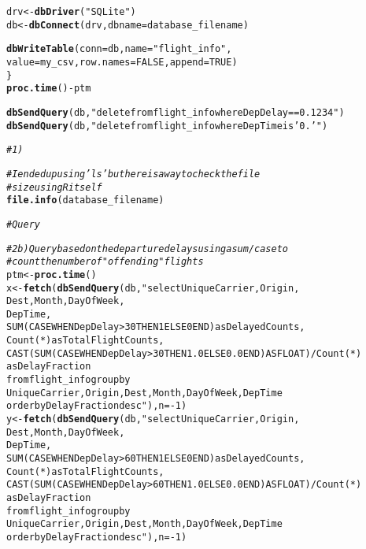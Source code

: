 \documentclass{article}\usepackage[]{graphicx}\usepackage[]{color}
\makeatletter
\newcommand{\hlnum}[1]{\textcolor[rgb]{0.686,0.059,0.569}{#1}}%
\newcommand{\hlstr}[1]{\textcolor[rgb]{0.192,0.494,0.8}{#1}}%
\newcommand{\hlcom}[1]{\textcolor[rgb]{0.678,0.584,0.686}{\textit{#1}}}%
\newcommand{\hlopt}[1]{\textcolor[rgb]{0,0,0}{#1}}%
\newcommand{\hlstd}[1]{\textcolor[rgb]{0.345,0.345,0.345}{#1}}%
\newcommand{\hlkwb}[1]{\textcolor[rgb]{0.69,0.353,0.396}{#1}}%
\newcommand{\hlkwc}[1]{\textcolor[rgb]{0.333,0.667,0.333}{#1}}%
\newcommand{\hlkwd}[1]{\textcolor[rgb]{0.737,0.353,0.396}{\textbf{#1}}}%
\newenvironment{kframe}{%
 \def\at@end@of@kframe{}%
 \ifinner\ifhmode%
  \def\at@end@of@kframe{\end{minipage}}%
  \begin{minipage}{\columnwidth}%
 \fi\fi%
 \def\FrameCommand##1{\hskip\@totalleftmargin \hskip-\fboxsep
 \colorbox{shadecolor}{##1}\hskip-\fboxsep
     \hskip-\linewidth \hskip-\@totalleftmargin \hskip\columnwidth}%
 \MakeFramed {\advance\hsize-\width
   \@totalleftmargin\z@ \linewidth\hsize
   \@setminipage}}%
 {\par\unskip\endMakeFramed%
 \at@end@of@kframe}
\newenvironment{knitrout}{}{} %
\makeatother
\begin{document}
\begin{knitrout}
\begin{kframe}
\begin{alltt}
  \hlstd{drv} \hlkwb{<-} \hlkwd{dbDriver}\hlstd{(}\hlstr{"SQLite"}\hlstd{)}
  \hlstd{db} \hlkwb{<-} \hlkwd{dbConnect}\hlstd{(drv,} \hlkwc{dbname} \hlstd{= database_filename)}

  \hlkwd{dbWriteTable}\hlstd{(}\hlkwc{conn} \hlstd{= db,} \hlkwc{name} \hlstd{=} \hlstr{"flight_info"}\hlstd{,}
             \hlkwc{value} \hlstd{= my_csv,} \hlkwc{row.names} \hlstd{=} \hlnum{FALSE}\hlstd{,} \hlkwc{append} \hlstd{=} \hlnum{TRUE}\hlstd{)}
\hlstd{\}}
\hlkwd{proc.time}\hlstd{()} \hlopt{-} \hlstd{ptm}

\hlkwd{dbSendQuery}\hlstd{(db,} \hlstr{"delete from flight_info where DepDelay==0.1234"}\hlstd{)}
\hlkwd{dbSendQuery}\hlstd{(db,} \hlstr{"delete from flight_info where DepTime is '0.'"}\hlstd{)}

\hlcom{# 1)}

\hlcom{# I ended up using 'ls' but here is a way to check the file}
\hlcom{# size using R itself}
\hlkwd{file.info}\hlstd{(database_filename)}

\hlcom{# Query }

\hlcom{# 2b) Query based on the departure delays using a sum/case to}
\hlcom{# count the number of "offending" flights}
\hlstd{ptm} \hlkwb{<-} \hlkwd{proc.time}\hlstd{()}
\hlstd{x} \hlkwb{<-} \hlkwd{fetch}\hlstd{(}\hlkwd{dbSendQuery}\hlstd{(db,} \hlstr{"select UniqueCarrier, Origin, 
                       Dest, Month, DayOfWeek, 
                       DepTime,
                       SUM(CASE WHEN DepDelay > 30 THEN 1 ELSE 0 END) as DelayedCounts, 
                       Count(*) as TotalFlightCounts,
                       CAST(SUM(CASE WHEN DepDelay > 30 THEN 1.0 ELSE 0.0 END) AS FLOAT) / Count(*) 
                       as DelayFraction
                       from flight_info group by
                       UniqueCarrier, Origin, Dest, Month, DayOfWeek, DepTime
                       order by DelayFraction desc"}\hlstd{),}\hlkwc{n}\hlstd{=}\hlopt{-}\hlnum{1}\hlstd{)}
\hlstd{y} \hlkwb{<-} \hlkwd{fetch}\hlstd{(}\hlkwd{dbSendQuery}\hlstd{(db,} \hlstr{"select UniqueCarrier, Origin, 
                       Dest, Month, DayOfWeek, 
                       DepTime,
                       SUM(CASE WHEN DepDelay > 60 THEN 1 ELSE 0 END) as DelayedCounts, 
                       Count(*) as TotalFlightCounts,
                       CAST(SUM(CASE WHEN DepDelay > 60 THEN 1.0 ELSE 0.0 END) AS FLOAT) / Count(*) 
                       as DelayFraction
                       from flight_info group by
                       UniqueCarrier, Origin, Dest, Month, DayOfWeek, DepTime
                       order by DelayFraction desc"}\hlstd{),}\hlkwc{n}\hlstd{=}\hlopt{-}\hlnum{1}\hlstd{)}


\end{alltt}
\end{kframe}
\end{knitrout}
\end{document}

